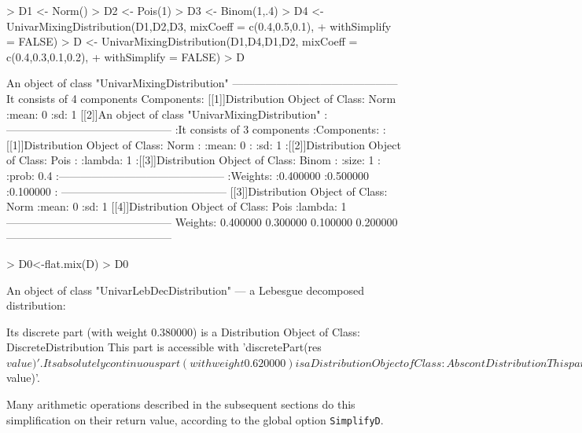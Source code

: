 \documentclass[11pt]{article}
\newcommand{\code}[1]{{\tt #1}}
\begin{document}
\begin{Schunk}
\begin{Sinput}
> D1 <- Norm()
> D2 <- Pois(1)
> D3 <- Binom(1,.4)
> D4 <- UnivarMixingDistribution(D1,D2,D3, mixCoeff = c(0.4,0.5,0.1), 
+       withSimplify = FALSE)
> D <- UnivarMixingDistribution(D1,D4,D1,D2, mixCoeff = c(0.4,0.3,0.1,0.2), 
+       withSimplify = FALSE)
> D
\end{Sinput}
\begin{Soutput}
An object of class "UnivarMixingDistribution"
 ---------------------------------------------
 It consists of  4 components 
 Components: 
 [[1]]Distribution Object of Class: Norm
       :mean: 0
       :sd: 1
 [[2]]An object of class "UnivarMixingDistribution"
       :---------------------------------------------
       :It consists of  3 components 
       :Components: 
       :[[1]]Distribution Object of Class: Norm
       :      :mean: 0
       :      :sd: 1
       :[[2]]Distribution Object of Class: Pois
       :      :lambda: 1
       :[[3]]Distribution Object of Class: Binom
       :      :size: 1
       :      :prob: 0.4
       :---------------------------------------------
       :Weights: 
       :0.400000       :0.500000       :0.100000       :
 ---------------------------------------------
 [[3]]Distribution Object of Class: Norm
       :mean: 0
       :sd: 1
 [[4]]Distribution Object of Class: Pois
       :lambda: 1
 ---------------------------------------------
 Weights: 
 0.400000 0.300000 0.100000 0.200000 
 ---------------------------------------------
\end{Soutput}
\begin{Sinput}
> D0<-flat.mix(D)
> D0
\end{Sinput}
\begin{Soutput}
An object of class "UnivarLebDecDistribution"
 --- a Lebesgue decomposed distribution:

    Its discrete part (with weight 0.380000) is a
 Distribution Object of Class: DiscreteDistribution
 This part is accessible with 'discretePart(res$value)'.

    Its absolutely continuous part (with weight 0.620000) is a
 Distribution Object of Class: AbscontDistribution
 This part is accessible with 'acPart(res$value)'.
\end{Soutput}
\end{Schunk}

Many arithmetic operations described in the subsequent sections do
this simplification on their return value, according to the global option
\code{SimplifyD}.
\end{document}
